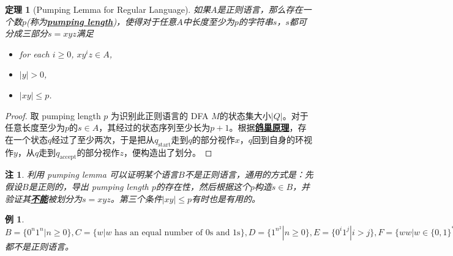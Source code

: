 \documentclass[8pt]{article}
\theoremstyle{compact}
\newtheorem{theorem}{定理}
\newtheorem{example}{例}
\newtheorem{remark}{注}
\def\obj#1{\textbf{\uline{#1}}}
\def\le{\leqslant}
\def\ge{\geqslant}
\begin{document}
\begin{theorem}[Pumping Lemma for Regular Language]
	如果$A$是正则语言，那么存在一个数$p$(称为\obj{pumping length})，使得对于任意$A$中长度至少为$p$的字符串$s$，$s$都可分成三部分$s = xyz$满足
	\begin{itemize}
		\item for each $i \ge 0$, $xy^iz \in A$,
		\item $|y| > 0$,
		\item $|xy| \le p$.
	\end{itemize}
\end{theorem}
\begin{proof}
	取 pumping length $p$ 为识别此正则语言的 DFA $M$的状态集大小$|Q|$。对于任意长度至少为$p$的$s \in A$，其经过的状态序列至少长为$p+1$。根据\obj{鸽巢原理}，存在一个状态$q$经过了至少两次，于是把从$q_{\text{start}}$走到$q$的部分视作$x$，$q$回到自身的环视作$y$，从$q$走到$q_{\text{accept}}$的部分视作$z$，便构造出了划分。
\end{proof}
\begin{remark}
	利用 pumping lemma 可以证明某个语言$B$不是正则语言，通用的方式是：先假设$B$是正则的，导出 pumping length $p$的存在性，然后根据这个$p$构造$s \in B$，并验证其\obj{不能}被划分为$s = xyz$。第三个条件$|xy| \le p$有时也是有用的。
\end{remark}
\begin{example}
	$B = \{0^n1^n | n \ge 0\}, C = \{w | w \text{ has an equal number of 0s and 1s}\}, D = \{1^{n^2} | n \ge 0\}, E = \{0^i1^j | i > j\}, F = \{ww | w \in \{0, 1\}^*\}$都不是正则语言。
\end{example}

\newpage
\end{document}
